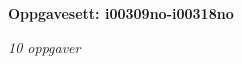 \centerline{\bf Oppgavesett: i00309no-i00318no}
\vskip 10pt
\centerline{\it 10 oppgaver}\vskip 10pt
\vskip 10pt
